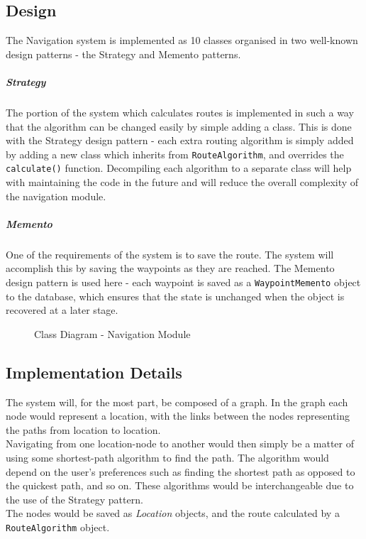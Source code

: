 \documentclass[english]{article}
\begin{document}
        \subsection{Design}
            The Navigation system is implemented as 10 classes organised in two well-known design patterns - the Strategy and Memento patterns.

            \subparagraph{Strategy}
            The portion of the system which calculates routes is implemented in such a way that the algorithm can be changed easily by simple adding a class. This is done with the Strategy design pattern - each extra routing algorithm is simply added by adding a new class which inherits from \texttt{RouteAlgorithm}, and overrides the \texttt{calculate()} function. Decompiling each algorithm to a separate class will help with maintaining the code in the future and will reduce the overall complexity of the navigation module.

            \subparagraph{Memento}
            One of the requirements of the system is to save the route. The system will accomplish this by saving the waypoints as they are reached. The Memento design pattern is used here - each waypoint is saved as a \texttt{WaypointMemento} object to the database, which ensures that the state is unchanged when the object is recovered at a later stage.

        \begin{figure}[H]
            \centering              
            \centerline{}
            \caption{Class Diagram - Navigation Module}
        \end{figure}

        \subsection{Implementation Details}
            The system will, for the most part, be composed of a graph. In the graph each node would represent a location, with the links between the nodes representing the paths from location to location. \\
            Navigating from one location-node to another would then simply be a matter of using some shortest-path algorithm to find the path. The algorithm would depend on the user's preferences such as finding the shortest path as opposed to the quickest path, and so on. These algorithms would be interchangeable due to the use of the Strategy pattern. \\
            The nodes would be saved as \textit{Location} objects, and the route calculated by a \texttt{RouteAlgorithm} object.
\end{document}

